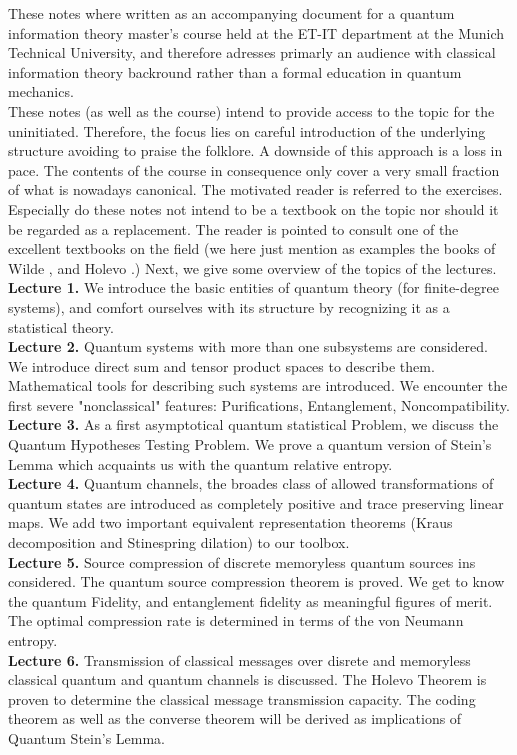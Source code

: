 These notes where written as an accompanying document for a quantum information theory master's course held at the ET-IT department at the Munich Technical University, and therefore adresses primarly an audience with classical information theory backround rather than a formal education in quantum mechanics.\\
These notes (as well as the course) intend to provide access to the topic for the uninitiated. Therefore, the focus lies on careful introduction of the underlying structure avoiding to praise the folklore. A downside of this approach is a loss in pace. The contents of the course in consequence only cover a very small fraction of what is nowadays canonical. The motivated reader is referred to the exercises.\\
Especially do these notes not intend to be a textbook on the topic nor should it be regarded as a replacement. The reader is pointed to consult one of the excellent textbooks on the field (we here just mention as examples the books of  Wilde \cite{wilde13}, and Holevo \cite{holevo12a}.) 
Next, we give some overview of the topics of the lectures.  \vspace{3ex} \\
\textbf{Lecture 1.} We introduce the basic entities of quantum theory (for finite-degree systems), and comfort ourselves with its structure by recognizing it as a statistical theory.  \\
\textbf{Lecture 2.} Quantum systems with more than one subsystems are considered. We introduce direct sum and tensor product spaces to describe them. Mathematical tools for describing such systems are introduced. We encounter the first severe "nonclassical" features: Purifications, Entanglement, Noncompatibility. \\
\textbf{Lecture 3.} As a first asymptotical quantum statistical Problem, we discuss the Quantum Hypotheses Testing Problem. We prove a quantum version of Stein's Lemma which acquaints us with the quantum relative entropy.  \\
\textbf{Lecture 4.} Quantum channels, the broades class of allowed transformations of quantum states are introduced as completely positive and trace preserving linear maps. 
We add two important equivalent representation theorems (Kraus decomposition and Stinespring dilation) to our toolbox.  \\
\textbf{Lecture 5.} Source compression of discrete memoryless quantum sources ins considered. The quantum source compression theorem is proved. We get to know the quantum Fidelity, and entanglement fidelity as meaningful figures of merit. The optimal compression rate is determined in terms of the von Neumann entropy. \\
\textbf{Lecture 6.} Transmission of classical messages over disrete and memoryless classical quantum and quantum channels is discussed. The Holevo Theorem is proven to 
determine the classical message transmission capacity. The coding theorem as well as the converse theorem will be derived as implications of Quantum Stein's Lemma. \vspace{3ex}

